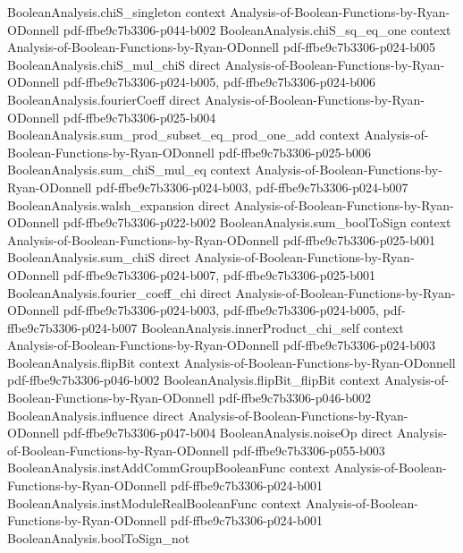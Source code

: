 \begin{theorem}
\proofstep
  {BooleanAnalysis.chiS_singleton}
  {context}
  {Analysis-of-Boolean-Functions-by-Ryan-ODonnell}
  {pdf-ffbe9c7b3306-p044-b002}
\proofstep
  {BooleanAnalysis.chiS_sq_eq_one}
  {context}
  {Analysis-of-Boolean-Functions-by-Ryan-ODonnell}
  {pdf-ffbe9c7b3306-p024-b005}
\proofstep
  {BooleanAnalysis.chiS_mul_chiS}
  {direct}
  {Analysis-of-Boolean-Functions-by-Ryan-ODonnell}
  {pdf-ffbe9c7b3306-p024-b005,
    pdf-ffbe9c7b3306-p024-b006}
\proofstep
  {BooleanAnalysis.fourierCoeff}
  {direct}
  {Analysis-of-Boolean-Functions-by-Ryan-ODonnell}
  {pdf-ffbe9c7b3306-p025-b004}
\proofstep
  {BooleanAnalysis.sum_prod_subset_eq_prod_one_add}
  {context}
  {Analysis-of-Boolean-Functions-by-Ryan-ODonnell}
  {pdf-ffbe9c7b3306-p025-b006}
\proofstep
  {BooleanAnalysis.sum_chiS_mul_eq}
  {context}
  {Analysis-of-Boolean-Functions-by-Ryan-ODonnell}
  {pdf-ffbe9c7b3306-p024-b003,
    pdf-ffbe9c7b3306-p024-b007}
\proofstep
  {BooleanAnalysis.walsh_expansion}
  {direct}
  {Analysis-of-Boolean-Functions-by-Ryan-ODonnell}
  {pdf-ffbe9c7b3306-p022-b002}
\proofstep
  {BooleanAnalysis.sum_boolToSign}
  {context}
  {Analysis-of-Boolean-Functions-by-Ryan-ODonnell}
  {pdf-ffbe9c7b3306-p025-b001}
\proofstep
  {BooleanAnalysis.sum_chiS}
  {direct}
  {Analysis-of-Boolean-Functions-by-Ryan-ODonnell}
  {pdf-ffbe9c7b3306-p024-b007,
    pdf-ffbe9c7b3306-p025-b001}
\proofstep
  {BooleanAnalysis.fourier_coeff_chi}
  {direct}
  {Analysis-of-Boolean-Functions-by-Ryan-ODonnell}
  {pdf-ffbe9c7b3306-p024-b003,
    pdf-ffbe9c7b3306-p024-b005,
    pdf-ffbe9c7b3306-p024-b007}
\proofstep
  {BooleanAnalysis.innerProduct_chi_self}
  {context}
  {Analysis-of-Boolean-Functions-by-Ryan-ODonnell}
  {pdf-ffbe9c7b3306-p024-b003}
\proofstep
  {BooleanAnalysis.flipBit}
  {context}
  {Analysis-of-Boolean-Functions-by-Ryan-ODonnell}
  {pdf-ffbe9c7b3306-p046-b002}
\proofstep
  {BooleanAnalysis.flipBit_flipBit}
  {context}
  {Analysis-of-Boolean-Functions-by-Ryan-ODonnell}
  {pdf-ffbe9c7b3306-p046-b002}
\proofstep
  {BooleanAnalysis.influence}
  {direct}
  {Analysis-of-Boolean-Functions-by-Ryan-ODonnell}
  {pdf-ffbe9c7b3306-p047-b004}
\proofstep
  {BooleanAnalysis.noiseOp}
  {direct}
  {Analysis-of-Boolean-Functions-by-Ryan-ODonnell}
  {pdf-ffbe9c7b3306-p055-b003}
\proofstep
  {BooleanAnalysis.instAddCommGroupBooleanFunc}
  {context}
  {Analysis-of-Boolean-Functions-by-Ryan-ODonnell}
  {pdf-ffbe9c7b3306-p024-b001}
\proofstep
  {BooleanAnalysis.instModuleRealBooleanFunc}
  {context}
  {Analysis-of-Boolean-Functions-by-Ryan-ODonnell}
  {pdf-ffbe9c7b3306-p024-b001}
\proofstep
  {BooleanAnalysis.boolToSign_not}

\end{theorem}
